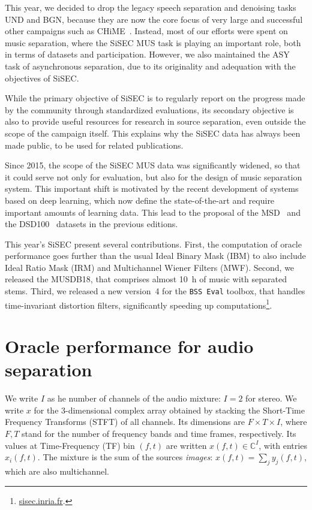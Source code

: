\documentclass{article}
\newcommand{\ft}{\left(f,t\right)}
\begin{document}
This year, we decided to drop the legacy speech separation and denoising tasks UND and BGN, because they are now the core focus of very large and successful other campaigns such as CHiME~\cite{chime,chime2,chime3}. Instead, most of our efforts were spent on music separation, where the SiSEC MUS task is playing an important role, both in terms of datasets and participation. However, we also maintained the ASY task of asynchronous separation, due to its originality and adequation with the objectives of SiSEC.

While the primary objective of SiSEC is to regularly report on the progress made by the community through standardized evaluations, its secondary objective is also to provide useful resources for research in source separation, even outside the scope of the campaign itself. This explains why the SiSEC data has always been made public, to be used for related publications.

Since 2015, the scope of the SiSEC MUS data was significantly widened, so that it could serve not only for evaluation, but also for the design of music separation system. This important shift is motivated by the recent development of systems based on deep learning, which now define the state-of-the-art and require important amounts of learning data. This lead to the proposal of the MSD~\cite{sisec2015} and the DSD100~\cite{sisec2016} datasets in the previous editions.%

This year's SiSEC present several contributions. First, the computation of oracle performance goes further than the usual Ideal Binary Mask (IBM) to also include Ideal Ratio Mask (IRM) and Multichannel Wiener Filters (MWF). Second, we released the MUSDB18, that comprises almost 10~h of music with separated stems. Third, we released a new version~4 for the \texttt{BSS~Eval} toolbox, that handles time-invariant distortion filters, significantly speeding up computations\footnote{\url{sisec.inria.fr}.}.

\section{Oracle performance for audio separation}
\label{sec:oracle}

We write $I$ as he number of channels of the audio mixture: $I=2$ for stereo. We write $x$ for the 3-dimensional complex array obtained by stacking the Short-Time Frequency Transforms (STFT) of all channels. Its dimensions are $F\times T\times I$, where $F,T$ stand for the number of frequency bands and time frames, respectively. Its values at Time-Frequency (TF) bin $\ft$ are  written $x\ft\in\mathbb{C}^I$, with entries $x_i\ft$. The mixture is the sum of the sources \textit{images}: $x\ft=\sum_j y_j\ft$, which are also multichannel.
\end{document}
